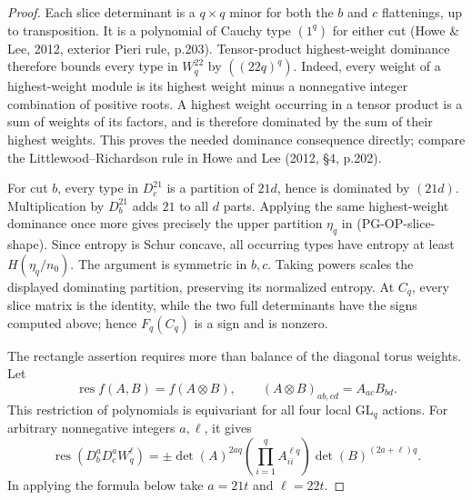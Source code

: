 \begin{proof}
Each slice determinant is a $q\times q$ minor for both the $b$ and $c$
flattenings, up to transposition. It is a polynomial of Cauchy type
$(1^q)$ for either cut (Howe \& Lee, 2012, exterior Pieri rule,
p.203). Tensor-product highest-weight dominance therefore
bounds every type in $W_q^{22}$ by $( (22q)^q )$. Indeed, every weight
of a highest-weight module is its highest weight minus a nonnegative
integer combination of positive roots. A highest weight occurring in
a tensor product is a sum of weights of its factors, and is therefore
dominated by the sum of their highest weights. This proves the needed
dominance consequence directly; compare the Littlewood--Richardson
rule in Howe and Lee (2012, \S4, p.202).

For cut $b$, every type in $D_c^{21}$ is a partition of $21d$, hence
is dominated by $(21d)$. Multiplication by $D_b^{21}$ adds $21$ to all
$d$ parts. Applying the same highest-weight dominance once more gives
precisely the upper partition $\eta_q$ in (PG-OP-slice-shape). Since
entropy is Schur concave, all occurring types have entropy at least
$H(\eta_q/n_0)$. The argument is symmetric in $b,c$. Taking powers
scales the displayed dominating partition, preserving its normalized
entropy. At $C_q$, every slice matrix is the identity, while the two
full determinants have the signs computed above; hence $F_q(C_q)$ is
a sign and is nonzero.

The rectangle assertion requires more than balance of the diagonal
torus weights. Let
\[
 \operatorname{res}f(A,B)=f(A\otimes B),\qquad
 (A\otimes B)_{ab,cd}=A_{ac}B_{bd}.
\]
This restriction of polynomials is equivariant for all four local
$\mathrm{GL}_q$ actions. For arbitrary nonnegative integers $a,\ell$,
it gives
\[
 \operatorname{res}(D_b^aD_c^aW_q^\ell)
 =\pm\det(A)^{2aq}
        \left(\prod_{i=1}^q A_{ii}^{\ell q}\right)
        \det(B)^{(2a+\ell)q}.
 \tag{PG-OP-slice-restriction}
\]
In applying the formula below take $a=21t$ and $\ell=22t$.


\end{proof}
